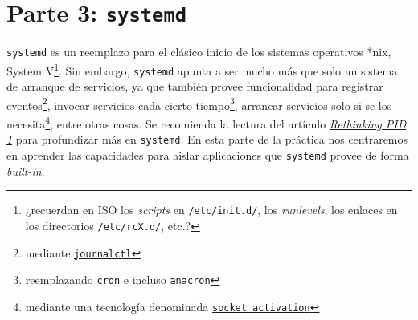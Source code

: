 \section{Parte 3: \texttt{systemd}}
\texttt{systemd} es un reemplazo para el clásico inicio de los sistemas
operativos *nix, System V\footnote{¿recuerdan en ISO los \textit{scripts}
  en \texttt{/etc/init.d/}, los \textit{runlevels}, los enlaces en los
  directorios \texttt{/etc/rcX.d/}, etc.?}. Sin embargo, \texttt{systemd}
apunta a ser mucho más que solo un sistema de arranque de servicios, ya que
también provee funcionalidad para registrar eventos\footnote{mediante
  \texttt{\href{http://0pointer.de/blog/projects/journalctl.html}{journalctl}}},
invocar servicios cada cierto tiempo\footnote{reemplazando \texttt{cron} e
  incluso \texttt{anacron}}, arrancar servicios solo si se los
necesita\footnote{mediante una tecnología denominada
  \texttt{\href{http://0pointer.de/blog/projects/socket-activation.html}{socket
      activation}}}, entre otras cosas. Se recomienda la lectura del
artículo
\textit{\href{http://0pointer.de/blog/projects/systemd.html}{Rethinking PID
    1}} para profundizar más en \texttt{systemd}. En esta parte de la
práctica nos centraremos en aprender las capacidades para aislar
aplicaciones que \texttt{systemd} provee de forma \textit{built-in}.

